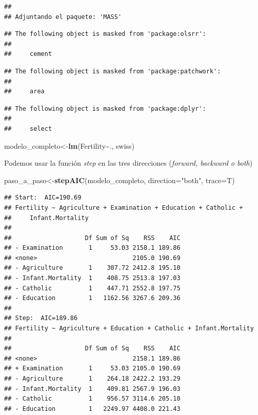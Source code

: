\documentclass[
]{book}
\newenvironment{Shaded}{\begin{snugshade}}{\end{snugshade}}
\newcommand{\AttributeTok}[1]{\textcolor[rgb]{0.13,0.29,0.53}{#1}}
\newcommand{\FunctionTok}[1]{\textcolor[rgb]{0.13,0.29,0.53}{\textbf{#1}}}
\newcommand{\NormalTok}[1]{#1}
\newcommand{\OtherTok}[1]{\textcolor[rgb]{0.56,0.35,0.01}{#1}}
\newcommand{\SpecialCharTok}[1]{\textcolor[rgb]{0.81,0.36,0.00}{\textbf{#1}}}
\newcommand{\StringTok}[1]{\textcolor[rgb]{0.31,0.60,0.02}{#1}}
\begin{document}
\begin{verbatim}
## 
## Adjuntando el paquete: 'MASS'
\end{verbatim}

\begin{verbatim}
## The following object is masked from 'package:olsrr':
## 
##     cement
\end{verbatim}

\begin{verbatim}
## The following object is masked from 'package:patchwork':
## 
##     area
\end{verbatim}

\begin{verbatim}
## The following object is masked from 'package:dplyr':
## 
##     select
\end{verbatim}

\begin{Shaded}
\begin{Highlighting}[]
\NormalTok{modelo\_completo}\OtherTok{\textless{}{-}}\FunctionTok{lm}\NormalTok{(Fertility}\SpecialCharTok{\textasciitilde{}}\NormalTok{., swiss)}
\end{Highlighting}
\end{Shaded}

Podemos usar la función \emph{step} en las tres direcciones (\emph{forward, backward o both})

\begin{Shaded}
\begin{Highlighting}[]
\NormalTok{paso\_a\_paso}\OtherTok{\textless{}{-}}\FunctionTok{stepAIC}\NormalTok{(modelo\_completo, }\AttributeTok{direction=}\StringTok{"both"}\NormalTok{, }\AttributeTok{trace=}\NormalTok{T)}
\end{Highlighting}
\end{Shaded}

\begin{verbatim}
## Start:  AIC=190.69
## Fertility ~ Agriculture + Examination + Education + Catholic + 
##     Infant.Mortality
## 
##                    Df Sum of Sq    RSS    AIC
## - Examination       1     53.03 2158.1 189.86
## <none>                          2105.0 190.69
## - Agriculture       1    307.72 2412.8 195.10
## - Infant.Mortality  1    408.75 2513.8 197.03
## - Catholic          1    447.71 2552.8 197.75
## - Education         1   1162.56 3267.6 209.36
## 
## Step:  AIC=189.86
## Fertility ~ Agriculture + Education + Catholic + Infant.Mortality
## 
##                    Df Sum of Sq    RSS    AIC
## <none>                          2158.1 189.86
## + Examination       1     53.03 2105.0 190.69
## - Agriculture       1    264.18 2422.2 193.29
## - Infant.Mortality  1    409.81 2567.9 196.03
## - Catholic          1    956.57 3114.6 205.10
## - Education         1   2249.97 4408.0 221.43
\end{verbatim}
\end{document}
